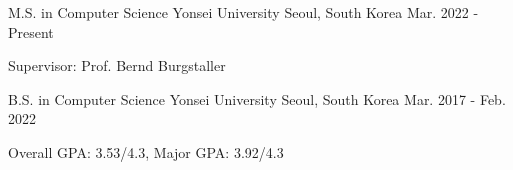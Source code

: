 

\begin{cventries}

  \cventry
    {M.S. in Computer Science} %
    {Yonsei University} %
    {Seoul, South Korea} %
    {Mar. 2022 - Present} %
    {
      \begin{cvitems} %
        \item {Supervisor: Prof. Bernd Burgstaller}
      \end{cvitems}
    }

  \cventry
    {B.S. in Computer Science} %
    {Yonsei University} %
    {Seoul, South Korea} %
    {Mar. 2017 - Feb. 2022} %
    {
      \begin{cvitems} %
        \item {Overall GPA: 3.53/4.3, Major GPA: 3.92/4.3}
      \end{cvitems}
    }
\end{cventries}

